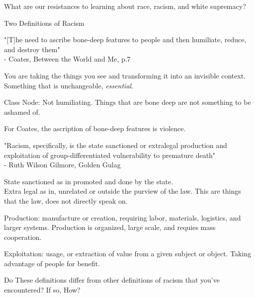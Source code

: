 \documentclass{report}
\begin{document}
{\huge What are our resistances to learning about race,
racism, and white supremacy?}
\begin{mdframed}
    {\large
    Two Definitions of Racism}
    
    \begin{description}
        \item "[T]he need to ascribe bone-deep features to
            people and then humiliate, reduce, and destroy
            them"\\
            - Coates, Between the World and Me, p.7

            \vspace{20}

            You are taking the things you see and transforming
            it into an invisible context. Something that is
            unchangeable, {\it essential}.
            
            
            \begin{center}
                \begin{mdframed}
                    Class Node: Not humiliating. Things that
                    are bone deep are not something to be
                    ashamed of.
                \end{mdframed}
            \end{center}

            For Coates, the ascription of bone-deep features
            is violence.
            
        \item "Racism, specifically, is the state sanctioned
            or extralegal production and exploitation of
            group-differentiated vulnerability to premature
            death"\\
            - Ruth Wilson Gilmore, Golden Gulag

            State sanctioned as in promoted and done by the
            state.\\
            Extra legal as in, unrelated or outside the
            purview of the law. This are things that the
            law, does not directly speak on.

            Production: manufacture or creation, requiring
            labor, materials, logistics, and larger systems.
            Production is organized, large scale, and requies
            mass cooperation.

            Exploitation: usage, or extraction of value from
            a given subject or object. Taking advantage
            of people for benefit.


            Do These definitions differ from other definitions
            of racism that you've encountered? If so, How?

    \end{description}

\end{mdframed}
\end{document}
